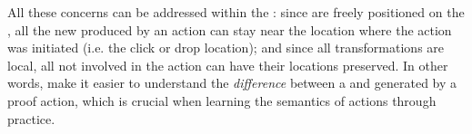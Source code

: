 \begin{scope}
\begin{description}
    All these concerns can be addressed within the  :
    since  are  freely positioned on the , all the new  produced by an action can stay near the
    location where the action was initiated (i.e. the click or drop location);
    and since all transformations are local, all  not involved in the
    action can have their locations preserved. In other words,  make
    it easier to understand the \emph{difference} between a  and
     generated by a proof action, which is crucial when learning
    the semantics of actions through practice.
\end{description}


\end{scope}
